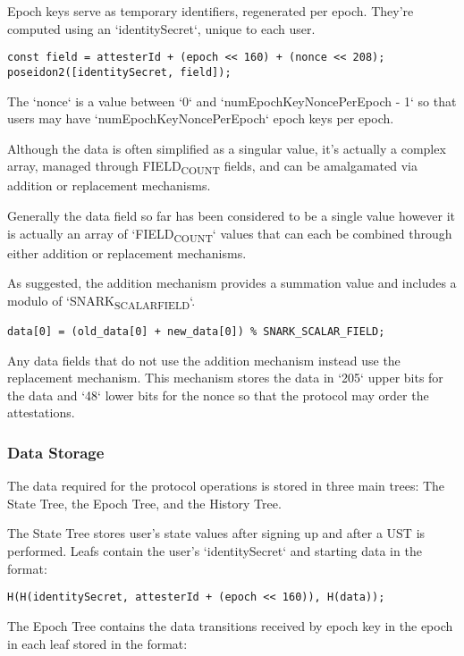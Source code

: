 \documentclass[11pt]{article}
\begin{document}
Epoch keys serve as temporary identifiers, regenerated per epoch. They're computed using an `identitySecret`, unique to each user.

\begin{verbatim}
const field = attesterId + (epoch << 160) + (nonce << 208);
poseidon2([identitySecret, field]);
\end{verbatim}

The `nonce` is a value between `0` and `numEpochKeyNoncePerEpoch - 1` so that users may have `numEpochKeyNoncePerEpoch` epoch keys per epoch.

Although the data is often simplified as a singular value, it's actually a complex array, managed through FIELD\textsubscript{COUNT} fields, and can be amalgamated via addition or replacement mechanisms.

Generally the data field so far has been considered to be a single value however it is actually an array of `FIELD\textsubscript{COUNT}` values that can each be combined through either addition or replacement mechanisms.

As suggested, the addition mechanism provides a summation value and includes a modulo of `SNARK\textsubscript{SCALAR}\textsubscript{FIELD}`.

\begin{verbatim}
data[0] = (old_data[0] + new_data[0]) % SNARK_SCALAR_FIELD;
\end{verbatim}

Any data fields that do not use the addition mechanism instead use the replacement mechanism. This mechanism stores the data in `205` upper bits for the data and `48` lower bits for the nonce so that the protocol may order the attestations.
\subsubsection{Data Storage}
\label{sec:org8366d68}

The data required for the protocol operations is stored in three main trees: The State Tree, the Epoch Tree, and the History Tree.

The State Tree stores user's state values after signing up and after a UST is performed. Leafs contain the user's `identitySecret` and starting data in the format:

\begin{verbatim}
H(H(identitySecret, attesterId + (epoch << 160)), H(data));
\end{verbatim}

The Epoch Tree contains the data transitions received by epoch key in the epoch in each leaf stored in the format:
\end{document}
